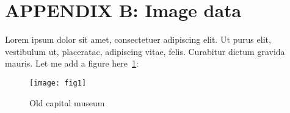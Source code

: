 \renewcommand{\hbAppendixPrefix}{B}
\renewcommand{\thefigure}{\hbAppendixPrefix.\arabic{figure}}
\setcounter{figure}{0}
\renewcommand{\thetable}{\hbAppendixPrefix.\arabic{table}} 
\setcounter{table}{0}

\section{APPENDIX \hbAppendixPrefix: Image data}

Lorem ipsum dolor sit amet, consectetuer adipiscing elit.  Ut purus elit, vestibulum ut, placeratac,  adipiscing vitae,  felis.   Curabitur dictum gravida mauris.
Let me add a figure here~\cref{fig:B1}:

\begin{figure}[h]
    \centering
    \captionsetup{width=0.7\linewidth} %
    \caption{Old capital museum}
    \texttt{[image: fig1]}
    \label{fig:B1}
\end{figure}
